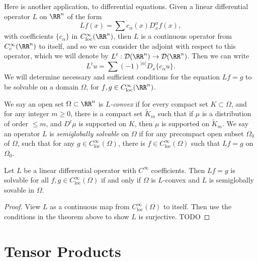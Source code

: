 Here is another application, to differential equations. Given a linear differential operator $L$ on $\RR^n$ of the form
%
\[ Lf(x) = \sum c_\alpha(x) D^\alpha_x f(x), \]
%
with coefficients $\{ c_\alpha \}$ in $C^\infty_{\text{loc}}(\RR^n)$, then $L$ is a continuous operator from $C_c^\infty(\RR^n)$ to itself, and so we can consider the adjoint with respect to this operator, which we will denote by $L^t: \mathcal{D}(\RR^n) \to \mathcal{D}(\RR^n)$. Then we can write
%
\[ L^t u = \sum (-1)^{|\alpha|} D_x \{ c_\alpha u \}. \]
%
We will determine necessary and sufficient conditions for the equation $Lf = g$ to be solvable on a domain $\Omega$, for $f,g \in C^\infty_{\text{loc}}(\RR^n)$.

We say an open set $\Omega \subset \RR^n$ is \emph{$L$-convex} if for every compact set $K \subset \Omega$, and for any integer $m \geq 0$, there is a compact set $\tilde{K}_m$ such that if $\mu$ is a distribution of order $\leq m$, and $D^t \mu$ is supported on $K$, then $\mu$ is supported on $\tilde{K}_m$. We say an operator $L$ is \emph{semiglobally solvable} on $\Omega$ if for any precompact open subset $\Omega_0$ of $\Omega$, such that for any $g \in C^\infty_{\text{loc}}(\Omega)$, there is $f \in C^\infty_{\text{loc}}(\Omega)$ such that $Lf = g$ on $\Omega_0$.

\begin{theorem}
    Let $L$ be a linear differential operator with $C^\infty$ coefficients. Then $Lf = g$ is solvable for all $f,g \in C^\infty_{\text{loc}}(\Omega)$ if and only if $\Omega$ is $L$-convex and $L$ is semiglobally sovable in $\Omega$.
\end{theorem}
\begin{proof}
    View $L$ as a continuous map from $C^\infty_{\text{loc}}(\Omega)$ to itself. Then use the conditions in the theorem above to show $L$ is surjective. TODO
\end{proof}






















\chapter{Tensor Products}

